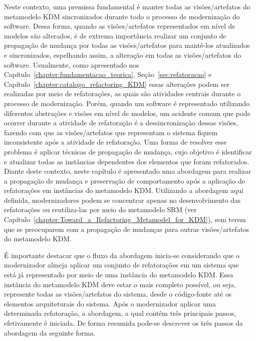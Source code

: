Neste contexto, uma premissa fundamental é manter todas as visões/artefatos do metamodelo KDM sincronizados durante todo o processo de modernização do software. Dessa forma, quando as visões/artefatos representados em nível de modelos são alterados, é de extrema importância realizar um conjunto de propagação de mudança por todas as visões/artefatos para mantê-los atualizados e sincronizados, espelhando assim, a alteração em todas as visões/artefatos do software. Usualmente, como apresentado nos Capítulo~\ref{chapter:fundamentacao_teorica}, Seção~\ref{sec:refatoracao} e Capítulo~\ref{chapter:catalogo_refactoring_KDM} essas alterações podem ser realizadas por meio de refatorações, as quais são atividades centrais durante o processo de modernização. Porém, quando um software é representado utilizando diferentes abstrações e visões em nível de modelos, um acidente comum que pode ocorrer durante a atividade de refatoração é a dessincronização dessas visões, fazendo com que as visões/artefatos que representam o sistema fiquem inconsistente após a atividade de refatoração. Uma forma de resolver esse problema é aplicar técnicas de propagação de mudança, cujo objetivo é identificar e atualizar todas as instâncias dependentes dos elementos que foram refatorados.%
Diante deste contexto, neste capítulo é apresentado uma abordagem para realizar a propagação de mudança e preservação de comportamento após a aplicação de refatorações em instâncias do metamodelo KDM. Utilizando a abordagem aqui definida, modernizadores podem se concentrar apenas no desenvolvimento das refatorações ou reutiliza-las por meio do metamodelo SRM (ver Capítulo~\ref{chapter:Toward_a_Refactoring_Metamodel_for_KDM}), sem terem que se preocuparem com a propagação de mudanças para outras visões/artefatos do metamodelo KDM. 

É importante destacar que o fluxo da abordagem inicia-se considerando que o modernizador almeja aplicar um conjunto de refatorações em um sistema que está já representado por meio de uma instância do metamodelo KDM. Essa instância do metamodelo KDM deve estar o mais completo possível, ou seja, represente todas as visões/artefatos do sistema, desde o código-fonte até os elementos arquiteturais do sistema. Após o modernizador aplicar uma determinada refatoração, a abordagem, a qual contêm três principais passos, efetivamente é iniciada. De forma resumida pode-se descrever os três passos da abordagem da seguinte forma. 

